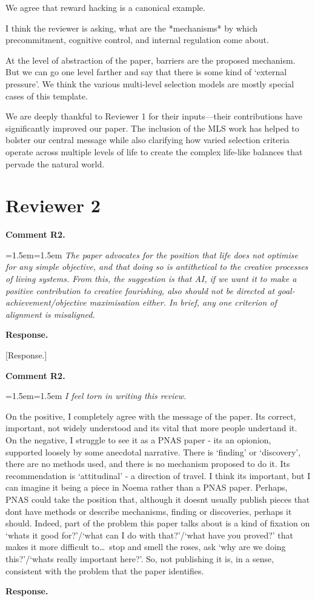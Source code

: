 \documentclass[fontsize=11.5pt]{scrartcl}
\newcounter{point}
\newcommand{\pointprefix}{}
\renewcommand{\thepoint}{\pointprefix.\arabic{point}}
\newcommand{\reviewersection}[2]{\section*{#1}\renewcommand{\pointprefix}{#2}\setcounter{point}{0}}
\newenvironment{reviewer}
  {\refstepcounter{point}\par\medskip
   \noindent\textbf{Comment \thepoint}\par
   \begingroup\leftskip=1.5em\rightskip=1.5em\itshape\color{reviewercolor}}
  {\par\endgroup\medskip\noindent\textbf{Response.}\ }
\begin{document}
We agree that reward hacking is a canonical example.

I think the reviewer is asking, what are the *mechanisms* by which precommitment, cognitive control, and internal regulation come about.

At the level of abstraction of the paper, barriers are the proposed mechanism. But we can go one level farther and say that there is some kind of `external pressure'. We think the various multi-level selection models are mostly special cases of this template.

We are deeply thankful to Reviewer 1 for their inputs---their contributions have significantly improved our paper. The inclusion of the MLS work has helped to bolster our central message while also clarifying how varied selection criteria operate across multiple levels of life to create the complex life-like balances that pervade the natural world.

\reviewersection{Reviewer 2}{R2}

\begin{reviewer}
The paper advocates for the position that life does not optimise for any simple objective, and that doing so is antithetical to the creative processes of living systems. From this, the suggestion is that AI, if we want it to make a positive contribution to creative fourishing, also should not be directed at goal-achievement/objective maximisation either. In brief, any one criterion of alignment is misaligned.
\end{reviewer}

[Response.]

\begin{reviewer}
I feel torn in writing this review.

On the positive, I completely agree with the message of the paper. Its correct, important, not widely understood and its vital that more people undertand it. On the negative, I struggle to see it as a PNAS paper - its an opionion, supported loosely by some anecdotal narrative. There is `finding' or `discovery', there are no methods used, and there is no mechanism proposed to do it. Its recommendation is `attitudinal' - a direction of travel. I think its important, but I can imagine it being a piece in Noema rather than a PNAS paper. Perhaps, PNAS could take the position that, although it doesnt usually publish pieces that dont have methods or describe mechanisms, finding or discoveries, perhaps it should. Indeed, part of the problem this paper talks about is a kind of fixation on `whats it good for?'/`what can I do with that?'/`what have you proved?' that makes it more difficult to\ldots\ stop and smell the roses, ask `why are we doing this?'/`whats really important here?'. So, not publishing it is, in a sense, consistent with the problem that the paper identifies.
\end{reviewer}
\end{document}
